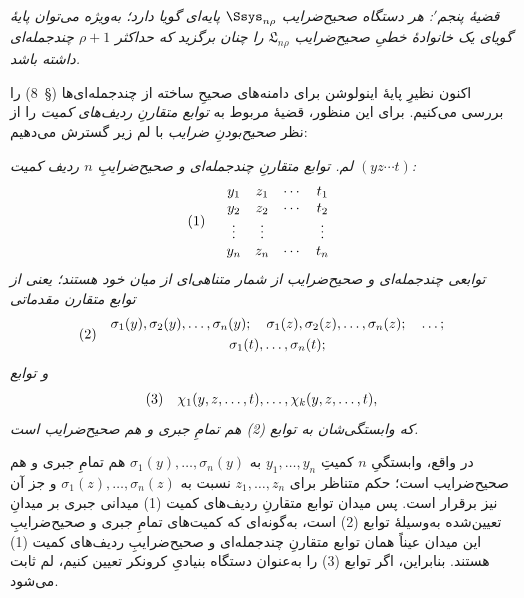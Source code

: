 \documentclass[11pt]{article}
\providecommand{\Lsys}{\mathfrak{L}}
\begin{document}
\emph{قضیهٔ پنجم$'$: هر دستگاه صحیح‌ضرایب $\Ssys_{n\rho}$ پایه‌ای گویا دارد؛ به‌ویژه می‌توان پایهٔ گویای یک خانوادهٔ خطیِ صحیح‌ضرایب $\Lsys_{n\rho}$ را چنان برگزید که حداکثر $\rho+1$ چندجمله‌ای داشته باشد.}

اکنون نظیرِ پایهٔ اینولوشن برای دامنه‌های صحیحِ ساخته از چندجمله‌ای‌ها (\S\ 8) را بررسی می‌کنیم. برای این منظور، قضیهٔ مربوط به \emph{توابع متقارنِ ردیف‌های کمیت} را از نظر \emph{صحیح‌بودنِ ضرایب} با لم زیر گسترش می‌دهیم:

\emph{لم. توابع متقارنِ چندجمله‌ای و صحیح‌ضرایبِ $n$ ردیف کمیت $(yz\cdots t)$:}
\[
\begin{array}{@{}l@{\quad}c@{}}
(1)&
\begin{array}{cccc}
  y_1&z_1&\cdots&t_1\\
  y_2&z_2&\cdots&t_2\\
  \vdots&\vdots&&\vdots\\
  y_n&z_n&\cdots&t_n
\end{array}
\end{array}
\]
\emph{توابعی چندجمله‌ای و صحیح‌ضرایب از شمار متناهی‌ای از میان خود هستند؛ یعنی از توابع متقارن مقدماتی}
\[
\begin{array}{@{}l@{\quad}c@{}}
(2)&
\begin{gathered}
  \sigma_1(y),\sigma_2(y),\ldots,\sigma_n(y);\quad
  \sigma_1(z),\sigma_2(z),\ldots,\sigma_n(z);\quad\ldots;\\
  \sigma_1(t),\ldots,\sigma_n(t);
\end{gathered}
\end{array}
\]
\emph{و توابع}
\[
\begin{array}{@{}l@{\quad}c@{}}
(3)&
  \chi_1(y,z,\ldots,t),\ldots,\chi_k(y,z,\ldots,t),
\end{array}
\]
\emph{که وابستگی‌شان به توابع (2) هم تمامِ جبری و هم صحیح‌ضرایب است.}

در واقع، وابستگیِ $n$ کمیتِ $y_1,
\ldots,y_n$ به $\sigma_1(y),
\ldots,\sigma_n(y)$ هم تمامِ جبری و هم صحیح‌ضرایب است؛ حکم متناظر برای $z_1,
\ldots,z_n$ نسبت به $\sigma_1(z),
\ldots,\sigma_n(z)$ و جز آن نیز برقرار است. پس میدان توابع متقارنِ ردیف‌های کمیت (1) میدانی جبری بر میدانِ تعیین‌شده به‌وسیلهٔ توابع (2) است، به‌گونه‌ای که کمیت‌های تمامِ جبری و صحیح‌ضرایبِ این میدان عیناً همان توابع متقارنِ چندجمله‌ای و صحیح‌ضرایبِ ردیف‌های کمیت (1) هستند. بنابراین، اگر توابع (3) را به‌عنوان دستگاه بنیادیِ کرونکر تعیین کنیم، لم ثابت می‌شود.
\end{document}
